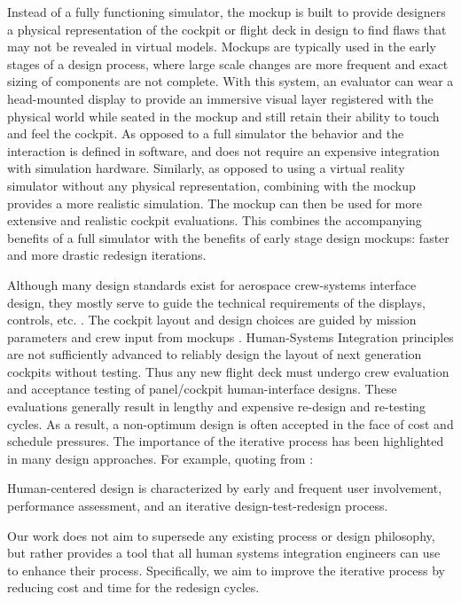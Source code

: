 Instead of a fully functioning simulator, the mockup is built to provide designers a physical representation of the cockpit or flight deck in design to find flaws that may not be revealed in virtual models.
Mockups are typically used in the early stages of a design process, where large scale changes are more frequent and exact sizing of components are not complete.
With this system, an evaluator can wear a head-mounted display to provide an immersive visual layer registered with the physical world while seated in the mockup and still retain their ability to touch and feel the cockpit.
As opposed to a full simulator the behavior and the interaction is defined in software, and does not require an expensive integration with simulation hardware.
Similarly, as opposed to using a virtual reality simulator without any physical representation, combining with the mockup provides a more realistic simulation.
The mockup can then be used for more extensive and realistic cockpit evaluations.
This combines the accompanying benefits of a full simulator with the benefits of early stage design mockups: faster and more drastic redesign iterations.

Although many design standards exist for aerospace crew-systems interface design, they mostly serve to guide the technical requirements of the displays, controls, etc. \citep{nasa_human_2010,nasa_nasa_2015,us_department_of_defense_department_1999}.
The cockpit layout and design choices are guided by mission parameters and crew input from mockups \citep{sexton_cockpitcrew_1988,jacobsen_crew_2010,zea_development_2012}.
Human-Systems Integration principles are not sufficiently advanced to reliably design the layout of next generation cockpits without testing.
Thus any new flight deck must undergo crew evaluation and acceptance testing of panel/cockpit human-interface designs.
These evaluations generally result in lengthy and expensive re-design and re-testing cycles.
As a result, a non-optimum design is often accepted in the face of cost and schedule pressures.
The importance of the iterative process has been highlighted in many design approaches.
For example, quoting from \citet{nasa_nasa_2015}:
\begin{displayquote}
Human-centered design \textelp is characterized by early and frequent user involvement, performance assessment, and an iterative design-test-redesign process.
\end{displayquote}
Our work does not aim to supersede any existing process or design philosophy, but rather provides a tool that all human systems integration engineers can use to enhance their process.
Specifically, we aim to improve the iterative process by reducing cost and time for the redesign cycles.

